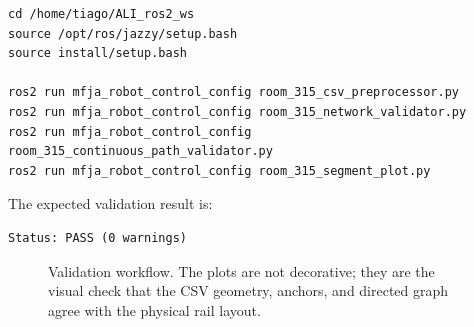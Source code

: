 \documentclass[12pt,a4paper]{report}
\newcommand{\codenext}[1]{\par\Needspace{#1\baselineskip}}
\begin{document}
\codenext{10}
\begin{lstlisting}[style=terminalcode,caption={Room 315 preprocessing and validation commands.}]
cd /home/tiago/ALI_ros2_ws
source /opt/ros/jazzy/setup.bash
source install/setup.bash

ros2 run mfja_robot_control_config room_315_csv_preprocessor.py
ros2 run mfja_robot_control_config room_315_network_validator.py
ros2 run mfja_robot_control_config room_315_continuous_path_validator.py
ros2 run mfja_robot_control_config room_315_segment_plot.py
\end{lstlisting}

The expected validation result is:

\begin{lstlisting}[style=terminalcode]
Status: PASS (0 warnings)
\end{lstlisting}

\begin{figure}[p]
\centering
{}
\caption{Validation workflow. The plots are not decorative; they are the visual
check that the CSV geometry, anchors, and directed graph agree with the physical
rail layout.}
\label{fig:validation-flow}
\end{figure}
\end{document}
